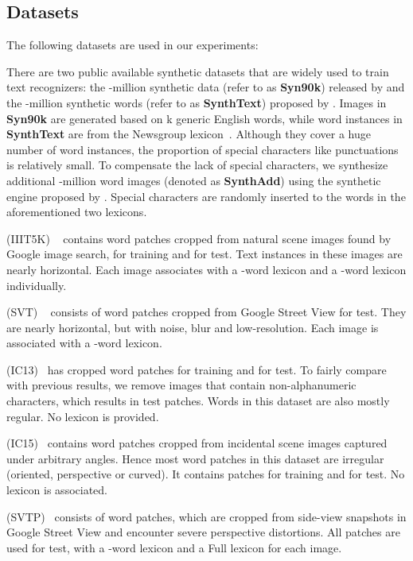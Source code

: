 \documentclass[letterpaper]{article} \usepackage{aaai19}  \usepackage{times}  \usepackage{helvet}  \usepackage{courier}  \usepackage{url}  \usepackage{graphicx}  \usepackage{amsmath}
\begin{document}
\subsection{Datasets}
The following datasets are used in our experiments:

There are two public available synthetic datasets that are widely used to train text recognizers: the -million synthetic data (refer to as \textbf{Syn90k}) released by \cite{Max2016IJCV} and the -million synthetic words (refer to as \textbf{SynthText}) proposed by \cite{Gupta16}.  Images in \textbf{Syn90k} are generated based on k generic English words, while word instances in \textbf{SynthText} are from the Newsgroup lexicon~\cite{Lang95}. Although they cover a huge number of word instances, the proportion of special characters like punctuations is relatively small. To compensate the lack of special characters, we synthesize additional -million word images (denoted as \textbf{SynthAdd}) using the synthetic engine proposed by \cite{Gupta16}. Special characters are randomly inserted to the words in the aforementioned two lexicons.


 (IIIT5K) ~\cite{MishraBMVC12}
contains  word patches cropped from natural scene images found by Google image search,  for training and  for test.
Text instances in these images are nearly horizontal. Each image associates with a -word lexicon and a -word lexicon individually.

 (SVT) ~\cite{Wangkai2011}
consists of  word patches cropped from Google Street View for test. They are nearly horizontal, but with noise, blur and low-resolution. Each image is associated with a -word lexicon.

 (IC13)~\cite{icdar2013}
has  cropped word patches for training and  for test. To fairly compare with previous results,
we remove images that contain non-alphanumeric characters, which results in  test patches.
Words in this dataset are also mostly regular. No lexicon is provided.

 (IC15)~\cite{icdar2015}
contains word patches cropped from incidental scene images captured under arbitrary angles.
Hence most word patches in this dataset are irregular (oriented, perspective or curved).
It contains  patches for training and  for test. No lexicon is associated.

 (SVTP)~\cite{SVTP}
consists of  word patches, which are cropped from side-view snapshots in Google Street View and encounter severe perspective distortions.
All patches are used for test, with a -word lexicon and a Full lexicon for each image.
\end{document}
